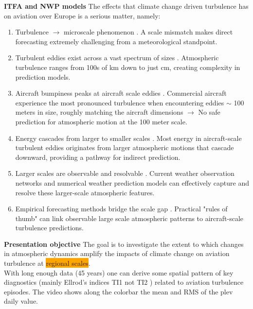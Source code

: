 \documentclass[9pt]{beamer}
\newcommand\Fontvi{\fontsize{6}{7.2}\selectfont}
\newcommand\Fonttab{\fontsize{12}{7.2}\selectfont}
\begin{document}
\begin{frame}[allowframebreaks]{\textbf{ITFA and NWP models}}
\Fontvi
The effects that climate change driven turbulence has on aviation over Europe is a serious matter, namely:
\begin{enumerate}
\item Turbulence $\longrightarrow$ microscale phenomenon . A scale mismatch makes direct forecasting extremely challenging from a meteorological standpoint.
\item Turbulent eddies exist across a vast spectrum of sizes . Atmospheric turbulence ranges from 100s of km down to just cm, creating complexity in prediction models.
\item Aircraft bumpiness peaks at aircraft scale eddies . Commercial aircraft experience the most pronounced turbulence when encountering eddies $\sim$ 100 meters in size, roughly matching the aircraft dimensions $\longrightarrow$ No safe prediction for atmospheric motion at the 100 meter scale.
\item Energy cascades from larger to smaller scales . Most energy in aircraft-scale turbulent eddies originates from larger atmospheric motions that cascade downward, providing a pathway for indirect prediction.
\item Larger scales are observable and resolvable . Current weather observation networks and numerical weather prediction models can effectively capture and resolve these larger-scale atmospheric features.
\item Empirical forecasting methods bridge the scale gap . Practical "rules of thumb" can link observable large scale atmospheric patterns to aircraft-scale turbulence predictions.
\end{enumerate}
\end{frame}

\begin{frame}[allowframebreaks]{\textbf{Presentation objective}}
\Fonttab
The goal is to investigate the extent to which changes in atmospheric dynamics amplify the impacts of climate change on aviation turbulence at \colorbox{orange}{regional scales}.
\centering
{}\\
With long enough data (45 years) one can derive some spatial pattern of key
diagnostics (mainly Ellrod's indices TI1 not TI2 \cite{ellrod1992}) related to aviation turbulence episodes. The video shows along the colorbar the mean and RMS of the plev daily value.
\end{frame}
\end{document}
